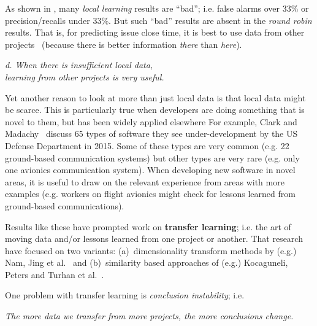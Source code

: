 As shown in ,
many {\em local learning} results are
  ``bad'';
i.e. false alarms over 33\% or precision/recalls
under 33\%. But such ``bad'' results are absent in the {\em round robin} results.
That is, for predicting  issue close time, it is best to use data from other  projects~\cite{rees2017better}
(because there is better  information {\em there}
than {\em here}).


\newpage

\begin{center}
{\em d. When there is insufficient local data,\\
learning from other projects is very useful.}
\end{center}
Yet another reason to look at more than just local data
is that   local data might be scarce.
This is particularly true when developers are doing something that is novel to them, but has been widely applied elsewhere
For example,
Clark and Madachy~\cite{clark15} discuss 65 types of software they see        under-development by
the US Defense Department in 2015.   Some of these types are very common (e.g.   22 ground-based communication systems)
but other types are very rare (e.g. only  one avionics communication system). When developing
 new software in  novel areas, it is useful to draw on the relevant  experience  from 
   areas with more   examples (e.g. workers on   flight avionics   might check for lessons
learned from ground-based communications).


 	
 

 

Results like  these have prompted   work on {\bf transfer learning};
i.e.  the art of moving data and/or lessons learned from one project or another.
That research have focused on two  variants: (a)~dimensionality transform  methods by (e.g.) Nam, 
Jing et al.~\cite{nam2017heterogeneous,Nam2015,Jing2015} and (b)~similarity based 
approaches of (e.g.) Kocaguneli, Peters and Turhan et  
al.~\cite{kocaguneli2011find,kocaguneli2012,turhan09,peters15}. 


One 
problem with transfer learning is  {\em conclusion instability}; i.e.  
\begin{center}
{\em The more
data we transfer from more projects, the more   conclusions change.}
\end{center}

